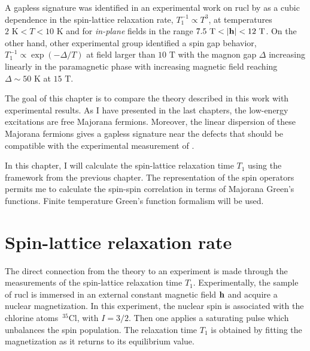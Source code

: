 \label{ch:6}

A gapless signature was identified in an experimental work on \acrshort{rucl} by \cite{Zheng-gapless2017} as a cubic dependence in the spin-lattice relaxation rate, $T_1^{-1} \propto T^3$, at temperatures $2 \text{ K} < T < 10 \text{ K}$ and for \textit{in-plane} fields in the range $ 7.5 \text{ T} < \vert \bf{h} \vert < 12 \text{ T}$.  On the other hand, other experimental group identified a spin gap behavior, $T_1^{-1} \propto \exp(-\Delta/T)$ at field larger than $ 10 \text{ T}$ with the magnon gap $\Delta$ increasing linearly in the paramagnetic phase with increasing magnetic field reaching $\Delta \sim 50 \text{ K}$ at $15 \text{ T}$.


The goal of this chapter is to compare the theory described in this work with experimental results. As I have presented in the last chapters, the low-energy excitations are free Majorana fermions. Moreover, the linear dispersion of these Majorana fermions gives a gapless signature near the defects that should be compatible with the experimental measurement of \cite{Zheng-gapless2017}.



In this chapter, I will calculate the spin-lattice relaxation time $T_1$ using the framework from the previous chapter. The representation of the spin operators permits me to calculate the spin-spin correlation in terms of Majorana Green's functions. Finite temperature Green's function formalism will be used.





\section{Spin-lattice relaxation rate}

The direct connection from the theory to an experiment is made through the measurements of the spin-lattice relaxation time $T_1$. Experimentally, the sample of \acrshort{rucl} is immersed in an external constant magnetic field $\bf{h}$ and acquire a nuclear magnetization. In this experiment, the nuclear spin is associated with the  %
chlorine atoms $\,^{35}\text{Cl}$, with $I=3/2$. Then one applies a saturating pulse which unbalances the spin population. The relaxation time $T_1$ is obtained by fitting the magnetization as it returns to its equilibrium value\cite{Baek2017}.

